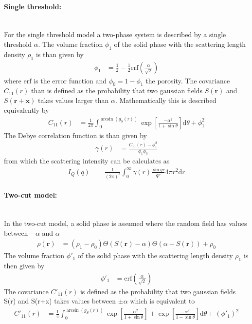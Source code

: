 \paragraph*{\textbf{Single threshold:}} \phantom{M}\hspace{1pt} \\

For the single threshold model a two-phase system is described by a single threshold $\alpha$. The volume fraction $\phi_1$ of the solid phase with the scattering length density $\rho_1$ is than given by
\begin{align}\label{eq:volumefraction_alpha}
  \phi_1 & = \frac12 - \frac12\mathrm{erf}\left(\frac{\alpha}{\sqrt{2}}\right)
\end{align}
where $\mathrm{erf}$ is the error function and $\phi_0=1-\phi_1$ the porosity. The covariance $C_{11}(r)$ than is defined as the probability that two gaussian fields $S(\mathbf{r})$ and $S(\mathbf{r}+\mathbf{x})$ takes values larger than $\alpha$. Mathematically this is described equivalently by
\begin{align}
  C_{11}(r) &= \frac{1}{2\pi} \int_0^{\arcsin(g_S(r))} \exp\left[\frac{-\alpha^2}{1+\sin\theta}\right] \mathrm{d}\theta + \phi_1^2
\end{align}
The Debye correlation function is than given by
\begin{align}
  \gamma(r) &= \frac{C_{11}(r) -\phi_1^2}{\phi_1\phi_0}
\end{align}
from which the scattering intensity can be calculates as
\begin{align}
  I_Q(q) &= \frac{1}{(2\pi)^3}\int_0^\infty \gamma(r) \frac{\sin qr}{qr} 4\pi r^2 \mathrm{d}r
\end{align}

\paragraph*{\textbf{Two-cut model:}}\hspace{1pt} \\
In the two-cut model, a solid phase is assumed where the random field has values between $-\alpha$ and $\alpha$
\begin{align}
  \rho(\mathbf{r}) & = (\rho_1-\rho_0) \Theta(S(\mathbf{r})-\alpha) \Theta(\alpha-S(\mathbf{r}))+ \rho_0
\end{align}
 The volume fraction $\phi'_1$ of the solid phase with the scattering length density $\rho_1$ is then given
by
\begin{align}\label{eq:Phi_1_twocut}
  \phi'_1 &= \mathrm{erf} \left( \frac{\alpha}{\sqrt{2}}\right)
\end{align}
The covariance $C'_{11}(r)$ is defined as the probability that two gaussian fields S(r) and S(r+x) takes values
between $\pm \alpha$ which is equivalent to
\begin{align}\label{eq:C11twocut}
  C'_{11}(r) &= \frac{1}{\pi} \int_0^{\arcsin(g_S(r))} \exp\left[\frac{-\alpha^2}{1+\sin\theta}\right] + \exp\left[\frac{-\alpha^2}{1-\sin\theta}\right]\mathrm{d}\theta + (\phi'_1)^2
\end{align}

